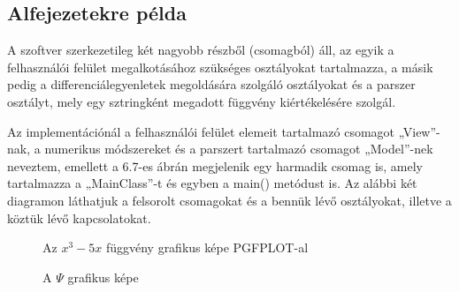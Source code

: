 \subsection{Alfejezetekre p\'elda}
	A szoftver szerkezetileg két nagyobb részből (csomagból) áll, az egyik a felhasználói felület megalkotásához szükséges osztályokat tartalmazza, a másik pedig a differenciálegyenletek megoldására szolgáló osztályokat és a parszer osztályt, mely egy sztringként megadott függvény kiértékelésére szolgál.
	
	Az implementációnál a felhasználói felület elemeit tartalmazó csomagot „View”-nak, a numerikus módszereket és a parszert tartalmazó csomagot „Model”-nek neveztem, emellett a 6.7-es ábrán megjelenik egy harmadik csomag is, amely tartalmazza a „MainClass”-t és egyben a main() metódust is. Az alábbi két diagramon láthatjuk a felsorolt csomagokat és a bennük lévő osztályokat, illetve a köztük lévő kapcsolatokat.
	\pagebreak
	\begin{figure}
		\centering
\caption{Az $x^3-5x$ f\"uggv\'eny grafikus k\'epe PGFPLOT-al}
\end{figure}


\begin{figure}[h!]
	\centering
	\caption{A $\Psi$ grafikus k\'epe}
\end{figure}
\pagebreak
